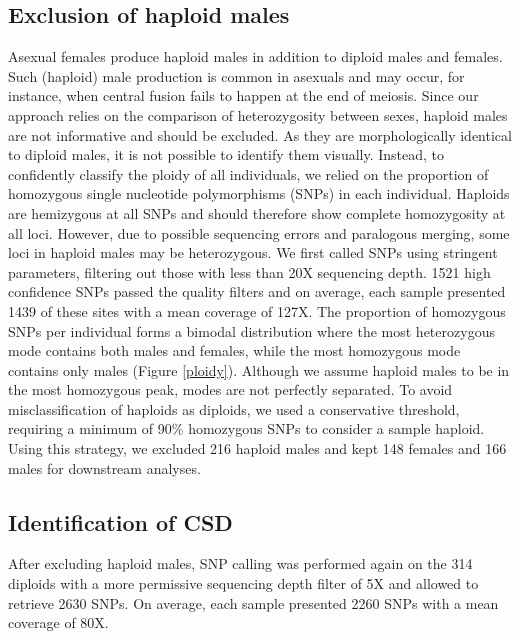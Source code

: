 \documentclass[11pt,a4paper]{report}
\begin{document}
\subsection{Exclusion of haploid males}
Asexual females produce haploid males in addition to diploid males and females. Such (haploid) male production is common in asexuals \citep{vanderKooi2014OnAsexuality} and may occur, for instance, when central fusion fails to happen at the end of meiosis. Since our approach relies on the comparison of heterozygosity between sexes, haploid males are not informative and should be excluded. As they are morphologically identical to diploid males, it is not possible to identify them visually. Instead, to confidently classify the ploidy of all individuals, we relied on the proportion of homozygous single nucleotide polymorphisms (SNPs) in each individual. Haploids are hemizygous at all SNPs and should therefore show complete homozygosity at all loci. However, due to possible sequencing errors and paralogous merging, some loci in haploid males may be heterozygous. We first called SNPs using stringent parameters, filtering out those with less than 20X sequencing depth. 1521 high confidence SNPs passed the quality filters and on average, each sample presented 1439 of these sites with a mean coverage of 127X. The proportion of homozygous SNPs per individual forms a bimodal distribution where the most heterozygous mode contains both males and females, while the most homozygous mode contains only males (Figure \ref{ploidy}). Although we assume haploid males to be in the most homozygous peak, modes are not perfectly separated. To avoid misclassification of haploids as diploids, we used a conservative threshold, requiring a minimum of 90\% homozygous SNPs to consider a sample haploid. Using this strategy, we excluded 216 haploid males and kept 148 females and 166 males for downstream analyses.

\subsection{Identification of  CSD}
After excluding haploid males, SNP calling was performed again on the 314 diploids with a more permissive sequencing depth filter of 5X and allowed to retrieve 2630 SNPs. On average, each sample presented 2260 SNPs with a mean coverage of 80X. 
\end{document}
